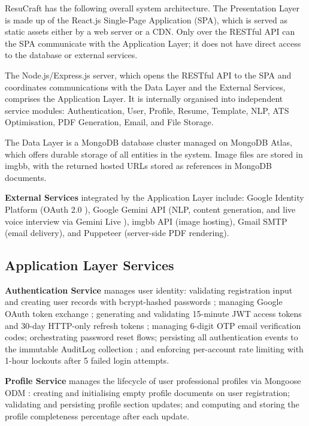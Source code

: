 \documentclass[12pt, a4paper, oneside]{report}
\begin{document}
ResuCraft has the following overall system architecture. The Presentation Layer is made up of the React.js Single-Page Application (SPA), which is served as static assets either by a web server or a CDN. Only over the RESTful API can the SPA communicate with the Application Layer\cite{restapi2011}; it does not have direct access to the database or external services.

The Node.js/Express.js server, which opens the RESTful API to the SPA and coordinates communications with the Data Layer and the External Services, comprises the Application Layer. It is internally organised into independent service modules: Authentication, User, Profile, Resume, Template, NLP, ATS Optimisation, PDF Generation, Email, and File Storage.

The Data Layer is a MongoDB database cluster\cite{mongodb2024} managed on MongoDB Atlas, which offers durable storage of all entities in the system. Image files are stored in imgbb\cite{imgbb2024}, with the returned hosted URLs stored as references in MongoDB documents.

\textbf{External Services} integrated by the Application Layer include: Google Identity Platform (OAuth 2.0 \cite{oauth2012}), Google Gemini API \cite{gemini2023} (NLP, content generation, and live voice interview via Gemini Live \cite{geminidocs2024}), imgbb API \cite{imgbb2024} (image hosting), Gmail SMTP (email delivery), and Puppeteer \cite{puppeteer2024} (server-side PDF rendering).

\subsection{Application Layer Services}

\textbf{Authentication Service} manages user identity: validating registration input and creating user records with bcrypt-hashed passwords \cite{bcrypt1999}; managing Google OAuth token exchange \cite{oauth2012}; generating and validating 15-minute JWT access tokens and 30-day HTTP-only refresh tokens \cite{jwt2015}; managing 6-digit OTP email verification codes; orchestrating password reset flows; persisting all authentication events to the immutable AuditLog collection \cite{owasp2021}; and enforcing per-account rate limiting with 1-hour lockouts after 5 failed login attempts.

\textbf{Profile Service} manages the lifecycle of user professional profiles via Mongoose ODM \cite{mongoose2024}: creating and initialising empty profile documents on user registration; validating and persisting profile section updates; and computing and storing the profile completeness percentage after each update.
\end{document}
